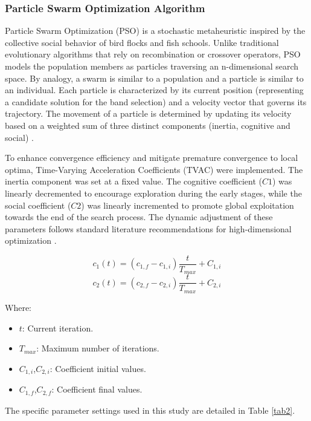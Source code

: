 \documentclass[ASNA,twocolumn]{USG}
\begin{document}
\subsubsection{Particle Swarm Optimization Algorithm}
Particle Swarm Optimization (PSO) is a stochastic metaheuristic inspired by the collective social behavior of bird flocks and fish schools. 
Unlike traditional evolutionary algorithms that rely on recombination or crossover operators, PSO models the population members as particles traversing an n-dimensional search space. By analogy, a swarm is similar to a population and a particle is similar to an individual.   
Each particle is characterized by its current position (representing a candidate solution for the band selection) and a velocity vector that governs its trajectory. 
The movement of a particle is determined by updating its velocity based on a weighted sum of three distinct components (inertia, cognitive and social) \cite{eiben_introduction_2015}.

To enhance convergence efficiency and mitigate premature convergence to local optima, Time-Varying Acceleration Coefficients (TVAC) were implemented. The inertia component was set at a fixed value.
The cognitive coefficient ($C1$) was linearly decremented to encourage exploration during the early stages, while the social coefficient ($C2$) was linearly incremented to promote global exploitation towards the end of the search process. 
The dynamic adjustment of these parameters follows standard literature recommendations for high-dimensional optimization \cite{ratnaweera_self-organizing_2004}. 

\begin{equation}
    c_1(t)=(c_{1,f}-c_{1,i}) \frac{t}{T_{max}}+C_{1,i}
\end{equation}
\begin{equation}
    c_2(t)=(c_{2,f}-c_{2,i}) \frac{t}{T_{max}}+C_{2,i}
\end{equation}

Where:
\begin{itemize}
    \item $t$: Current iteration.
    \item $T_{max}$: Maximum number of iterations.
    \item $C_{1,i}$,$C_{2,i}$: Coefficient initial values.
    \item $C_{1,f}$,$C_{2,f}$: Coefficient final values.
\end{itemize}
The specific parameter settings used in this study are detailed in Table \ref{tab2}.
\end{document}
